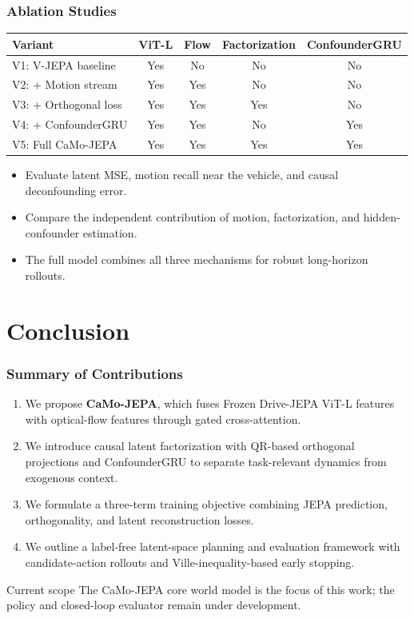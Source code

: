 \begin{frame}
  \frametitle{Ablation Studies}
  \scriptsize
  \setlength{\tabcolsep}{4pt}
  \renewcommand{\arraystretch}{1.2}
  \begin{tabular}{l|c|c|c|c}
    \textbf{Variant} & \textbf{ViT-L} & \textbf{Flow} & \textbf{Factorization} & \textbf{ConfounderGRU} \\
    \hline
    V1: V-JEPA baseline & Yes & No & No & No \\
    V2: + Motion stream & Yes & Yes & No & No \\
    V3: + Orthogonal loss & Yes & Yes & Yes & No \\
    V4: + ConfounderGRU & Yes & Yes & No & Yes \\
    V5: Full CaMo-JEPA & Yes & Yes & Yes & Yes \\
  \end{tabular}
  \vspace{0.6em}
  \begin{itemize}
    \item Evaluate latent MSE, motion recall near the vehicle, and causal deconfounding error.
    \item Compare the independent contribution of motion, factorization, and hidden-confounder estimation.
    \item The full model combines all three mechanisms for robust long-horizon rollouts.
  \end{itemize}
\end{frame}

\section{Conclusion}

\begin{frame}
  \frametitle{Summary of Contributions}
  \begin{enumerate}
    \item We propose \textbf{CaMo-JEPA}, which fuses Frozen Drive-JEPA ViT-L features with optical-flow features through gated cross-attention.
    \item We introduce causal latent factorization with QR-based orthogonal projections and ConfounderGRU to separate task-relevant dynamics from exogenous context.
    \item We formulate a three-term training objective combining JEPA prediction, orthogonality, and latent reconstruction losses.
    \item We outline a label-free latent-space planning and evaluation framework with candidate-action rollouts and Ville-inequality-based early stopping.
  \end{enumerate}
  \vspace{0.3em}
  \begin{block}{Current scope}
    The CaMo-JEPA core world model is the focus of this work; the policy and closed-loop evaluator remain under development.
  \end{block}
\end{frame}

